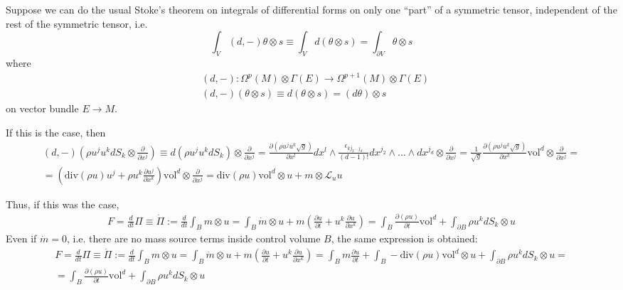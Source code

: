 \documentclass[twoside,landscape,10pt]{amsart}
\theoremstyle{plain}
\theoremstyle{definition}
\theoremstyle{remark}
\theoremstyle{remark}
\begin{document}
\begin{multicols*}{2}
Suppose we can do the usual Stoke's theorem on integrals of differential forms on only one ``part'' of a symmetric tensor, independent of the rest of the symmetric tensor, i.e.
\[
\int_V (d,-) \theta \otimes s \equiv \int_V d (\theta \otimes s) = \int_{ \partial V } \theta \otimes s
\]
where 
\[
\begin{aligned}
& (d,-) : \Omega^p(M) \otimes \Gamma(E) \to \Omega^{p+1}(M) \otimes \Gamma(E)  \\
  & (d,-) (\theta \otimes s) \equiv d (\theta \otimes s) = (d\theta) \otimes s
\end{aligned}
\]
on vector bundle $E\to M$.  

If this is the case, then
\[
\begin{gathered}
  (d,-)(\rho u^j u^k dS_k \otimes \frac{ \partial }{ \partial x^j} ) \equiv d(\rho u^j u^k dS_k) \otimes \frac{ \partial }{ \partial x^j} = \frac{ \partial ( \rho u^j u^k \sqrt{g} )}{ \partial x^l } dx^l \wedge \frac{ \epsilon_{kj_2 \dots j_d} }{(d-1)!} dx^{j_2} \wedge \dots \wedge dx^{j_d} \otimes \frac{ \partial }{ \partial x^j} = \frac{1}{\sqrt{g}} \frac{ \partial ( \rho u^j u^k \sqrt{g} )}{ \partial x^k} \text{vol}^d \otimes \frac{ \partial }{ \partial x^j} = \\
  = \left( \text{div}(\rho u) u^j + \rho u^k \frac{ \partial u^j }{ \partial x^k} \right) \text{vol}^d \otimes \frac{ \partial }{ \partial x^j } = \text{div}(\rho u) \text{vol}^d \otimes u + m \otimes \mathcal{L}_uu
\end{gathered}
\]

Thus, if this was the case, 
\[
\begin{gathered}
  F = \frac{d}{dt} \Pi \equiv \dot{\Pi} := \frac{d}{dt} \int_B m \otimes u = \int_B \dot{m} \otimes u + m \left( \frac{ \partial u}{ \partial t} + u^k \frac{ \partial u}{ \partial x^k} \right) = \int_B \frac{ \partial (\rho u)}{ \partial t} \text{vol}^d + \int_{ \partial B} \rho u^k dS_k \otimes u 
\end{gathered}
\]
Even if $\dot{m}=0$, i.e. there are no mass source terms inside control volume $B$, the same expression is obtained:
\[
\begin{gathered}
  F = \frac{d}{dt} \Pi \equiv \dot{\Pi} := \frac{d}{dt} \int_B m \otimes u = \int_B \dot{m} \otimes u + m \left( \frac{ \partial u}{ \partial t} + u^k \frac{ \partial u}{ \partial x^k} \right) = \int_B m\frac{ \partial  u}{ \partial t} + \int_B - \text{div}(\rho u) \text{vol}^d \otimes u  + \int_{ \partial B} \rho u^k dS_k \otimes u = \\
  =   \int_B \frac{ \partial ( \rho u )}{ \partial t} \text{vol}^d + \int_{ \partial B} \rho u^k dS_k \otimes u 
\end{gathered}
\]


\end{multicols*}
\end{document}

